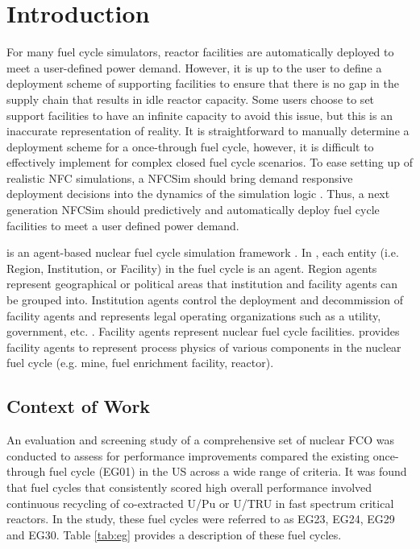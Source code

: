 \section{Introduction}
For many fuel cycle simulators, reactor facilities are automatically 
deployed to meet a user-defined power demand. 
However, it is up to the user to define a deployment scheme of 
supporting facilities to ensure that there is no gap in the supply 
chain that results in idle reactor capacity. 
Some users choose to set support facilities to have an infinite 
capacity to avoid this issue, but this is an inaccurate 
representation of reality. 
It is straightforward to manually determine a deployment scheme 
for a once-through fuel cycle, however, it is difficult to effectively 
implement for complex closed fuel cycle scenarios.  
To ease setting up of realistic \gls{NFC} simulations, a \gls{NFCSim}
should bring demand responsive deployment decisions into 
the dynamics of the simulation logic \cite{huff_current_2017}. 
Thus, a next generation \gls{NFCSim} should predictively and 
automatically deploy fuel cycle facilities to meet a user defined 
power demand. 

\Cyclus is an agent-based nuclear fuel cycle simulation framework 
\cite{huff_fundamental_2016}. 
In \Cyclus, each entity (i.e. Region, Institution, or Facility) in the 
fuel cycle is an agent. 
Region agents represent geographical or political areas that institution
and facility agents can be grouped into. 
Institution agents control the 
deployment and decommission of facility agents 
and represents legal operating organizations such as a 
utility, government, etc. \cite{huff_fundamental_2016}. 
Facility agents represent nuclear fuel cycle facilities. 
\Cycamore \cite{carlsen_cycamore_2014}
provides facility agents to represent process physics of various 
components in the nuclear fuel cycle (e.g. mine, fuel enrichment 
facility, reactor). 

\subsection{Context of Work}
An evaluation and screening study of a comprehensive set of nuclear 
\gls{FCO} \cite{wigeland_nuclear_2014} was conducted to assess 
for performance improvements compared the existing once-through 
fuel cycle (EG01) in the \gls{US} across a wide range of criteria. 
It was found that fuel cycles that consistently scored high 
overall performance involved continuous recycling
of co-extracted U/Pu or U/TRU in fast spectrum critical reactors. 
In the study, these fuel cycles were referred to as EG23, EG24, 
EG29 and EG30. 
Table \ref{tab:eg} provides a description of these fuel cycles. 

